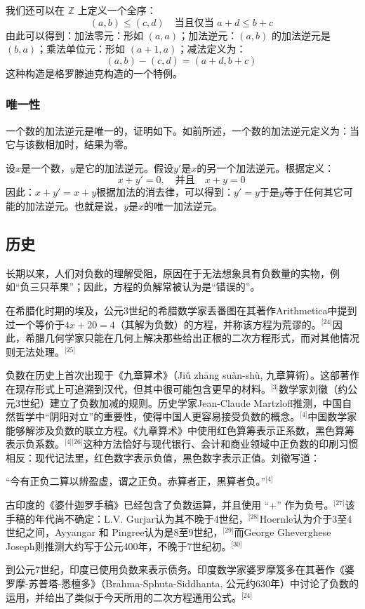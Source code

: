 我们还可以在 $\mathbb{Z}$ 上定义一个全序：
$$
(a, b) \leq (c, d) \quad \text{当且仅当 } a + d \leq b + c~
$$
由此可以得到：加法零元：形如 $(a, a)$；加法逆元：$(a, b)$ 的加法逆元是 $(b, a)$；乘法单位元：形如 $(a+1, a)$；减法定义为：
  $$
  (a, b) - (c, d) = (a + d, b + c)~
  $$
这种构造是格罗滕迪克构造的一个特例。
\subsubsection{唯一性}
一个数的加法逆元是唯一的，证明如下。如前所述，一个数的加法逆元定义为：当它与该数相加时，结果为零。

设$x$是一个数，$y$是它的加法逆元。假设$y'$是$x$的另一个加法逆元。根据定义：
$$
x + y' = 0, \quad \text{并且} \quad x + y = 0~
$$
因此：$x + y' = x + y$根据加法的消去律，可以得到：$y' = y$于是$y$等于任何其它可能的加法逆元。也就是说，$y$是$x$的唯一加法逆元。
\subsection{历史}
长期以来，人们对负数的理解受阻，原因在于无法想象具有负数量的实物，例如“负三只苹果”；因此，方程的负解常被认为是“错误的”。

在希腊化时期的埃及，公元3世纪的希腊数学家丢番图在其著作Arithmetica中提到过一个等价于$4x + 20 = 4$（其解为负数）的方程，并称该方程为荒谬的。\(^\text{[24]}\)因此，希腊几何学家只能在几何上解决那些给出正根的二次方程形式，而对其他情况则无法处理。\(^\text{[25]}\)

负数在历史上首次出现于《九章算术》（Jiǔ zhāng suàn-shù, 九章算術）。这部著作在现存形式上可追溯到汉代，但其中很可能包含更早的材料。\(^\text{[3]}\)数学家刘徽（约公元3世纪）建立了负数加减的规则。历史学家Jean-Claude Martzloff推测，中国自然哲学中“阴阳对立”的重要性，使得中国人更容易接受负数的概念。\(^\text{[4]}\)中国数学家能够解涉及负数的联立方程。《九章算术》中使用红色算筹表示正系数，黑色算筹表示负系数。\(^\text{[4][26]}\)这种方法恰好与现代银行、会计和商业领域中正负数的印刷习惯相反：现代记法里，红色数字表示负值，黑色数字表示正值。刘徽写道：

“今有正负二算以辨盈虚，谓之正负。赤算者正，黑算者负。”\(^\text{[4]}\)

古印度的《婆什迦罗手稿》已经包含了负数运算，并且使用 “+” 作为负号。\(^\text{[27]}\)该手稿的年代尚不确定：L.V. Gurjar认为其不晚于4世纪，\(^\text{[28]}\)Hoernle认为介于3至4世纪之间，Ayyangar 和 Pingree认为是8至9世纪，\(^\text{[29]}\)而George Gheverghese Joseph则推测大约写于公元400年，不晚于7世纪初。\(^\text{[30]}\)

到公元7世纪，印度已使用负数来表示债务。印度数学家婆罗摩笈多在其著作《婆罗摩-苏普塔-悉檀多》（Brahma-Sphuta-Siddhanta, 公元约630年）中讨论了负数的运用，并给出了类似于今天所用的二次方程通用公式。\(^\text{[24]}\)

